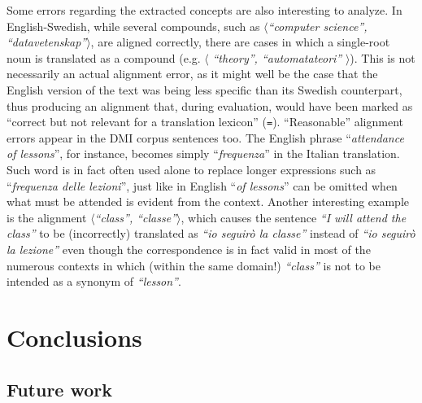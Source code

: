 \documentclass[11pt]{article}
\begin{document}
Some errors regarding the extracted concepts are also interesting to analyze.
In English-Swedish, while several compounds, such as $\langle$\textit{``computer science'', ``datavetenskap''}$\rangle$, are aligned correctly, there are cases in which a single-root noun is translated as a compound (e.g. $\langle$ \textit{``theory'', ``automatateori''} $\rangle$). 
This is not necessarily an actual alignment error, as it might well be the case that the English version of the text was being less specific than its Swedish counterpart, thus producing an alignment that, during evaluation, would have been marked as ``correct but not relevant for a translation lexicon'' (\texttt{=}). 
``Reasonable'' alignment errors appear in the DMI corpus sentences too. 
The English phrase ``\textit{attendance of lessons}'', for instance, becomes simply ``\textit{frequenza}'' in the Italian translation. 
Such word is in fact often used alone to replace longer expressions such as ``\textit{frequenza delle lezioni}'', just like in English ``\textit{of lessons}'' can be omitted when what must be attended is evident from the context.
Another interesting example is the alignment $\langle$\textit{``class'', ``classe''}$\rangle$, which causes the sentence \textit{``I will attend the class''} to be (incorrectly) translated as \textit{``io seguirò la classe''} instead of \textit{``io seguirò la lezione''} even though the correspondence is in fact valid in most of the numerous contexts in which (within the same domain!) \textit{``class''} is not to be intended as a synonym of \textit{``lesson''}.

\section{Conclusions} \label{conclusions}
\subsection{Future work}

%
%
\end{document}
